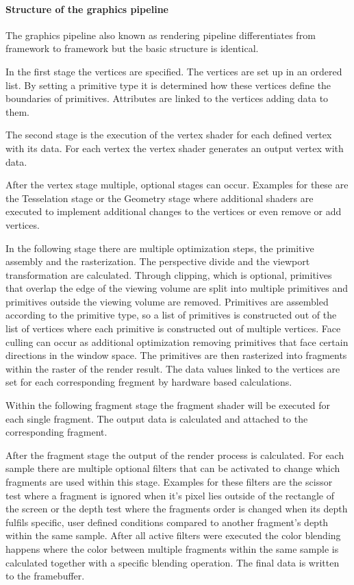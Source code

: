 \paragraph{Structure of the graphics pipeline}
\label{paragraph:pipeline}

The graphics pipeline also known as rendering pipeline differentiates from framework to framework but the basic structure is identical. 

In the first stage the vertices are specified. The vertices are set up in an ordered list. By setting a primitive type it is determined how these vertices define the boundaries of primitives. Attributes are linked to the vertices adding data to them.

The second stage is the execution of the vertex shader for each defined vertex with its data. For each vertex the vertex shader generates an output vertex with data.

After the vertex stage multiple, optional stages can occur. Examples for these are the Tesselation stage or the Geometry stage where additional shaders are executed to implement additional changes to the vertices or even remove or add vertices.

In the following stage there are multiple optimization steps, the primitive assembly and the rasterization. The perspective divide and the viewport transformation are calculated. Through clipping, which is optional, primitives that overlap the edge of the viewing volume are split into multiple primitives and primitives outside the viewing volume are removed. Primitives are assembled according to the primitive type, so a list of primitives is constructed out of the list of vertices where each primitive is constructed out of multiple vertices. Face culling can occur as additional optimization removing primitives that face certain directions in the window space. The primitives are then rasterized into fragments within the raster of the render result. The data values linked to the vertices are set for each corresponding fregment by hardware based calculations.

Within the following fragment stage the fragment shader will be executed for each single fragment. The output data is calculated and attached to the corresponding fragment.

After the fragment stage the output of the render process is calculated. For each sample there are multiple optional filters that can be activated to change which fragments are used within this stage. Examples for these filters are the scissor test where a fragment is ignored when it's pixel lies outside of the rectangle of the screen or the depth test where the fragments order is changed when its depth fulfils specific, user defined conditions compared to another fragment's depth within the same sample. After all active filters were executed the color blending happens where the color between multiple fragments within the same sample is calculated together with a specific blending operation. The final data is written to the framebuffer.

